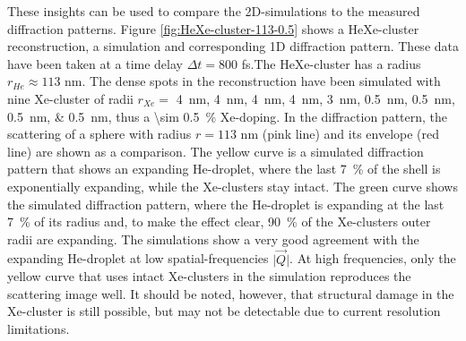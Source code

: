 These insights can be used to compare the 2D-simulations to the measured diffraction patterns. Figure \ref{fig:HeXe-cluster-113-0.5} shows a HeXe-cluster reconstruction, a simulation and corresponding 1D diffraction pattern. These data have been taken at a time delay $\Delta t=800$ fs.The HeXe-cluster has a radius $r_{He}\approx 113$ nm. The dense spots in the reconstruction have been simulated with nine Xe-cluster of radii $r_{Xe}=$ \SIlist{4;4;4;4;3;0.5;0.5;0.5;0.5}{\nano\meter}, thus a \SI{\sim 0.5}{\percent} Xe-doping. In the diffraction pattern, the scattering of a sphere with radius $r=113$ nm (pink line) and its envelope (red line) are shown as a comparison. The yellow curve is a simulated diffraction pattern that shows an expanding He-droplet, where the last \SI{7}{\percent} of the shell is exponentially expanding, while the Xe-clusters stay intact. The green curve shows the simulated diffraction pattern, where the He-droplet is expanding at the last \SI{7}{\percent} of its radius and, to make the effect clear, \SI{90}{\percent} of the Xe-clusters outer radii are expanding. The simulations show a very good agreement with the expanding He-droplet at low spatial-frequencies $\lvert\vec{Q}\rvert$. At high frequencies, only the yellow curve that uses intact Xe-clusters in the simulation reproduces the scattering image well. It should be noted, however, that structural damage in the Xe-cluster is still possible, but may not be detectable due to current resolution limitations.
%
%
%

